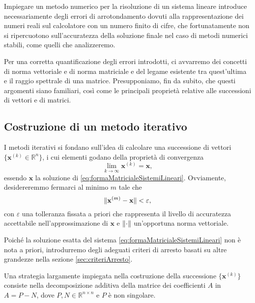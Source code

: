 Impiegare un metodo numerico per la risoluzione di un sistema lineare introduce necessariamente degli errori di arrotondamento dovuti alla rappresentazione
dei numeri reali sul calcolatore con un numero finito di cifre, che fortunatamente non si ripercuotono sull'accuratezza della soluzione finale nel caso di
metodi numerici stabili, come quelli che analizzeremo.

Per una corretta quantificazione degli errori introdotti, ci avvarremo dei concetti di norma vettoriale e di norma
matriciale e del legame esistente tra quest'ultima e il raggio spettrale di una matrice.\newline
Presupponiamo, fin da subito, che questi argomenti siano familiari, cos\`i come le principali propriet\`a relative alle successioni di vettori e di matrici.
\subsection{Costruzione di un metodo iterativo}
I metodi iterativi si fondano sull'idea di calcolare una successione di vettori \\ $\{\mathbf{x}^{(k)}\in\mathbb{R}^{n}\}$, i cui elementi godano della propriet\`a di convergenza
\begin{equation}
    \label{eq:proprietaConvergenza}
    \lim_{k \to \infty} \mathbf{x}^{(k)}=\mathbf{x},
\end{equation}
essendo $\mathbf{x}$ la soluzione di \eqref{eq:formaMatricialeSistemiLineari}. \newline
Ovviamente, desidereremmo fermarci al minimo $m$ tale che
\begin{equation*}
    \lVert\mathbf{x}^{(m)}- \mathbf{x}\rVert < \varepsilon,
\end{equation*}
con $\varepsilon$ una tolleranza fissata a priori che rappresenta il livello di accuratezza accettabile nell'approssimazione di $\mathbf{x}$ e $\lVert\cdot\rVert$ un'opportuna norma vettoriale.

Poich\'e la soluzione esatta del sistema \eqref{eq:formaMatricialeSistemiLineari} non \`e nota a priori, introdurremo degli adeguati criteri di arresto basati
su altre grandezze nella sezione \ref{sec:criteriArresto}.

Una strategia largamente impiegata nella costruzione della successione $\{\mathbf{x}^{(k)}\}$ consiste nella decomposizione additiva della matrice dei
coefficienti $A$ in $A=P-N$, dove $P, N\in\mathbb{R}^{n \times n}$ e $P$ \`e non singolare.

